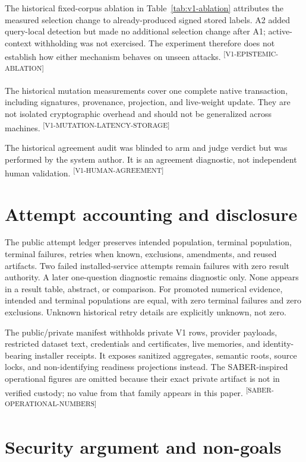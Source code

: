 \documentclass[10pt]{article}
\newcommand{\evidence}[1]{\textsuperscript{\scriptsize\textsf{[#1]}}}
\begin{document}


The historical fixed-corpus ablation in Table~\ref{tab:v1-ablation} attributes
the measured selection change to already-produced signed stored labels. A2
added query-local detection but made no additional selection change after A1;
active-context withholding was not exercised. The experiment therefore does not
establish how either mechanism behaves on unseen attacks.
\evidence{V1-EPISTEMIC-ABLATION}

The historical mutation measurements cover one complete native transaction,
including signatures, provenance, projection, and live-weight update. They are
not isolated cryptographic overhead and should not be generalized across
machines. \evidence{V1-MUTATION-LATENCY-STORAGE}

The historical agreement audit was blinded to arm and judge verdict but was
performed by the system author. It is an agreement diagnostic, not independent
human validation. \evidence{V1-HUMAN-AGREEMENT}

\section{Attempt accounting and disclosure}

The public attempt ledger preserves intended population, terminal population,
terminal failures, retries when known, exclusions, amendments, and reused
artifacts. Two failed installed-service attempts remain failures with zero result
authority. A later one-question diagnostic remains diagnostic only. None appears
in a result table, abstract, or comparison. For promoted numerical evidence,
intended and terminal populations are equal, with zero terminal failures and
zero exclusions. Unknown historical retry details are explicitly unknown, not
zero.

The public/private manifest withholds private V1 rows, provider payloads,
restricted dataset text, credentials and certificates, live memories, and
identity-bearing installer receipts. It exposes sanitized aggregates, semantic
roots, source locks, and non-identifying readiness projections instead. The
SABER-inspired operational figures are omitted because their exact private
artifact is not in verified custody; no value from that family appears in this
paper. \evidence{SABER-OPERATIONAL-NUMBERS}

\section{Security argument and non-goals}
\end{document}
